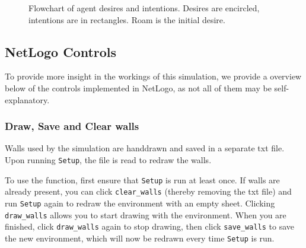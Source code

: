 \documentclass[a4paper]{article}
\begin{document}
\begin{figure}[!ht]
  \centering

\captionsetup{justification=centering,margin=1cm}
\caption{Flowchart of agent desires and intentions. Desires are encircled, intentions are in rectangles. Roam is the initial desire.}
\label{tikz:flow}
\end{figure}


\subsection{NetLogo Controls}
To provide more insight in the workings of this simulation, we provide a overview below of the controls implemented in NetLogo, as not all of them may be self-explanatory.

\subsubsection{Draw, Save and Clear walls}
Walls used by the simulation are handdrawn and saved in a separate txt file. Upon running \texttt{Setup}, the file is read to redraw the walls.

To use the function, first ensure that \texttt{Setup} is run at least once. If walls are already present, you can click \texttt{clear\_walls} (thereby removing the txt file) and run \texttt{Setup} again to redraw the environment with an empty sheet. Clicking \texttt{draw\_walls} allows you to start drawing with the environment. When you are finished, click \texttt{draw\_walls} again to stop drawing, then click \texttt{save\_walls} to save the new environment, which will now be redrawn every time \texttt{Setup} is run.
\end{document}
